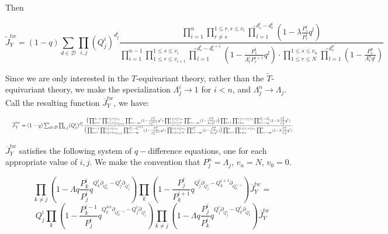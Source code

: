 \documentclass[11pt,letterpaper]{amsart}
\begin{document}
    Then 

    $$\tilde{J}_Y^{tw}=(1-q)\sum_{d\in \mathcal{D}} \prod_{i,j} (Q^i_{j})^{d^i_{j}}\frac{\prod_{i=1}^n\prod_{r\neq s}^{1\leq r,s\leq v_i}\widetilde{\prod}_{l=1}^{d^i_{s}-d^i_{r}}(1-\lambda\frac{P^i_{s}}{P^i_{r}}q^l)}{\prod_{i=1}^{n-1}\prod_{1\leq r\leq v_{i+1}}^{1\leq s\leq v_i}\widetilde{\prod}_{l=1}^{d^i_{s}-d^{i+1}_r}(1-\frac{P^i_{s}}{\Lambda^{i}_{r}P^{i+1}_r}q^l)\cdot\prod_{1\leq r\leq N}^{1\leq s\leq v_n}\widetilde{\prod}_{l=1}^{d^n_{s}}(1-\frac{P^n_{s}}{\Lambda^{n}_{r}q^l})}$$

 Since we are only interested in the $T$-equivariant theory, rather than the $\tilde{T}$-equivariant theory, we make the specialization $\Lambda^i_j\to 1$ for $i<n$, and $\Lambda^n_j\to \Lambda_j$. Call the resulting function $\overline{J}^{tw}_Y$, we have:
 


\begin{equation}\label{js1}
\resizebox{\hsize}{!}{$
\overline{J}^{tw}_Y=(1-q)\sum_{d\in \mathcal{D}} \prod_{i,j} (Q^i_{j})^{d^i_{j}}\frac{\big(\prod_{i=1}^{n-1}\prod_{1\leq r\leq v_{i+1}}^{1\leq s\leq v_i}\prod_{l=-\infty}^{0}(1-\frac{P^i_{s}}{P^{i+1}_r}q^l)\cdot\prod_{1\leq r\leq N}^{1\leq s\leq v_n}\prod_{l=-\infty}^{0}(1-\frac{P^n_{s}}{\Lambda_{r}q^l})\big)\prod_{i=1}^n\prod_{r\neq s}^{1\leq r,s\leq v_i}\prod_{l=-\infty}^{d^i_{s}-d^i_{r}}(1-\lambda\frac{P^i_{s}}{P^i_{r}}q^l)}{\big(\prod_{i=1}^{n-1}\prod_{1\leq r\leq v_{i+1}}^{1\leq s\leq v_i}\prod_{l=-\infty}^{d^i_{s}-d^{i+1}_r}(1-\frac{P^i_{s}}{P^{i+1}_r}q^l)\cdot\prod_{1\leq r\leq N}^{1\leq s\leq v_n}\prod_{l=-\infty}^{d^n_{s}}(1-\frac{P^n_{s}}{\Lambda_{r}q^l})\big)\prod_{i=1}^n\prod_{r\neq s}^{1\leq r,s\leq v_i}\prod_{l=-\infty}^{0}(1-\lambda\frac{P^i_{s}}{P^i_{r}}q^l)}$}
\end{equation}

$\overline{J}^{tw}_Y$ satisfies the following system of $q-$difference equations, one for each appropriate value of $i,j$. We make the convention that $P^n_j=\Lambda_j$, $v_n=N$, $v_0=0$. 



$$\prod_{k\neq j} (1-\Lambda q\frac{P^i_k}{P^i_j}q^{Q^i_k\partial_{Q^i_k}-Q^i_j\partial_{Q^i_j}})\prod_k(1-\frac{P^i_j}{P^{i+1}_k}q^{Q^i_j\partial_{Q^i_j}-Q^{i+1}_k\partial_{Q^{i+1}_k}})\overline{J}^{tw}_Y=$$
$$Q^i_j\prod_k(1-\frac{P^{i-1}_k}{P^{i}_j}q^{Q^{io1}_k\partial_{Q^{i-1}_k}-Q^i_j\partial_{Q^i_j}})\prod_{k\neq j}(1-\Lambda q\frac{P_j^i}{P_k^{i}}q^{Q^i_j\partial_{Q^i_j}-Q^i_k\partial_{Q^i_k}})\overline{J}^{tw}_Y$$
\end{document}
